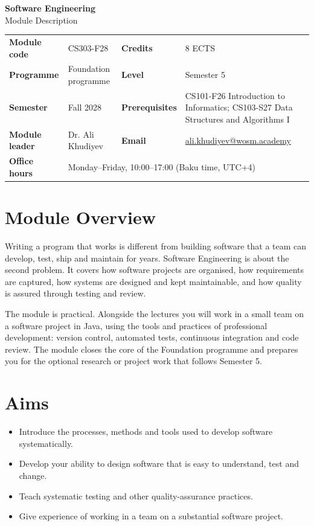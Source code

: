 \documentclass[11pt,a4paper]{article}
\makeatletter
\newcommand{\ModuleTitle}{Software Engineering}
\newcommand{\ModuleCode}{CS303-F28}
\newcommand{\Programme}{Foundation programme}
\newcommand{\Level}{Semester 5}
\newcommand{\Semester}{Fall 2028}
\newcommand{\Credits}{8 ECTS}
\newcommand{\ModuleLeader}{Dr. Ali Khudiyev}
\newcommand{\Email}{ali.khudiyev@wosm.academy}
\newcommand{\OfficeHours}{Monday--Friday, 10:00--17:00 (Baku time, UTC+4)}
\newcommand{\Prerequisites}{CS101-F26 Introduction to Informatics; CS103-S27 Data Structures and Algorithms I}
\makeatother
\begin{document}
\begin{center}
  {\LARGE\bfseries\color{accent} \ModuleTitle}\\[4pt]
  {\large Module Description}
\end{center}
\vspace{6pt}

\begin{tabularx}{\textwidth}{>{\bfseries}l X >{\bfseries}l X}
\toprule
Module code   & \ModuleCode    & Credits      & \Credits \\
Programme     & \Programme     & Level        & \Level \\
Semester      & \Semester      & Prerequisites & \Prerequisites \\
Module leader & \ModuleLeader  & Email        & \href{mailto:\Email}{\Email} \\
Office hours  & \multicolumn{3}{l}{\OfficeHours} \\
\bottomrule
\end{tabularx}

\section{Module Overview}
Writing a program that works is different from building software that a team can
develop, test, ship and maintain for years. Software Engineering is about the second
problem. It covers how software projects are organised, how requirements are
captured, how systems are designed and kept maintainable, and how quality is
assured through testing and review.

The module is practical. Alongside the lectures you will work in a small team on a
software project in Java, using the tools and practices of professional development:
version control, automated tests, continuous integration and code review. The module
closes the core of the Foundation programme and prepares you for the optional
research or project work that follows Semester 5.

\section{Aims}
\begin{itemize}
  \item Introduce the processes, methods and tools used to develop software systematically.
  \item Develop your ability to design software that is easy to understand, test and change.
  \item Teach systematic testing and other quality-assurance practices.
  \item Give experience of working in a team on a substantial software project.
\end{itemize}
\end{document}
